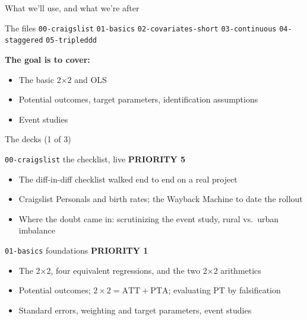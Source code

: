 \documentclass[aspectratio=169,11pt]{beamer}
\begin{document}
\begin{frame}{What we'll use, and what we're after}
\vspace{0.3em}
\begin{block}{The files}
\centering
\texttt{00-craigslist} \;\textperiodcentered\; \texttt{01-basics} \;\textperiodcentered\; \texttt{02-covariates-short} \;\textperiodcentered\; \texttt{03-continuous} \;\textperiodcentered\; \texttt{04-staggered} \;\textperiodcentered\; \texttt{05-tripleddd}
\end{block}
\vspace{0.5em}
\textbf{The goal is to cover:}
\vspace{0.2em}
\begin{itemize}\setlength\itemsep{0.4em}
  \item The basic 2$\times$2 and OLS
  \item Potential outcomes, target parameters, identification assumptions
  \item Event studies
\end{itemize}
\vspace{0.4em}
\end{frame}

\begin{frame}{The decks (1 of 3)}
\vspace{0.2em}
\footnotesize
\begin{block}{\texttt{00-craigslist} \;\textemdash\; the checklist, live \hfill \textnormal{\small\color{accent}\bfseries PRIORITY 5}}
\begin{itemize}\setlength\itemsep{0.1em}
  \item The diff-in-diff checklist walked end to end on a real project
  \item Craigslist Personals and birth rates; the Wayback Machine to date the rollout
  \item Where the doubt came in: scrutinizing the event study, rural vs.\ urban imbalance
\end{itemize}
\end{block}
\vspace{0.4em}
\begin{block}{\texttt{01-basics} \;\textemdash\; foundations \hfill \textnormal{\small\color{accent}\bfseries PRIORITY 1}}
\begin{itemize}\setlength\itemsep{0.1em}
  \item The 2$\times$2, four equivalent regressions, and the two 2$\times$2 arithmetics
  \item Potential outcomes; $2\times2 = \text{ATT} + \text{PTA}$; evaluating PT by falsification
  \item Standard errors, weighting and target parameters, event studies
\end{itemize}
\end{block}
\end{frame}
\end{document}
